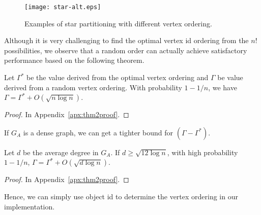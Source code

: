 \begin{figure}[h]
\centering
\texttt{[image: star-alt.eps]}
\caption{Examples of star partitioning with different vertex ordering.}
\label{fig:star-alt}
\end{figure}



Although it is very challenging to find the optimal vertex id ordering from the $n!$ possibilities, we observe that a random order can actually achieve satisfactory performance based on the following theorem.



\begin{theorem}
\label{THM:SPM_LB}
Let $\Gamma^*$ be the value derived from the optimal vertex ordering and  $\Gamma$ be value derived from a random vertex ordering. With probability $1-1/n$, we have $\Gamma = \Gamma^* + O(\sqrt{n \log n})$.
\end{theorem}
\begin{proof}
In Appendix~\ref{apx:thm2proof}.
\end{proof}
If $G_A$ is a dense graph, we can get a tighter bound for $(\Gamma - \Gamma^*)$.
\begin{theorem}
\label{THM:SPM_LB_INC}
Let $d$ be the average degree in $G_A$. If $d\geq \sqrt{12\log n}$, with
high probability $1-1/n$, $\Gamma = \Gamma^* + O(\sqrt{d\log n})$.
\end{theorem}
\begin{proof}
In Appendix~\ref{apx:thm2proof}.
\end{proof}
Hence, we can simply use object id to determine the vertex ordering in our implementation.


